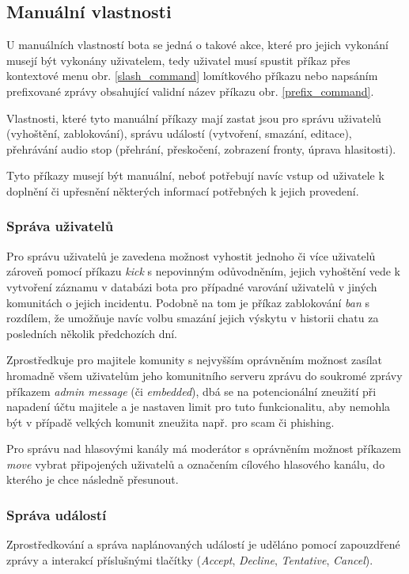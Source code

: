 \documentclass[
  program=inf,
biblatex=false,
sourcecodes=true,
joinlists=true,
  figures=true,
  tables=true,
  glossaries=true,
  index=false
]{kidiplom}
\begin{document}
\subsection{Manuální vlastnosti}
U manuálních vlastností bota se jedná o takové akce, které pro jejich vykonání musejí být vykonány uživatelem,
tedy uživatel musí spustit příkaz přes kontextové menu obr. \ref{slash_command} lomítkového příkazu nebo 
napsáním prefixované zprávy obsahující validní název příkazu obr. \ref{prefix_command}.

Vlastnosti, které
tyto manuální příkazy mají zastat jsou pro správu uživatelů (vyhoštění, zablokování), správu událostí (vytvoření, smazání, editace),
přehrávání audio stop (přehrání, přeskočení, zobrazení fronty, úprava hlasitosti).

Tyto příkazy musejí být manuální, neboť potřebují navíc vstup od uživatele k doplnění či upřesnění
některých informací potřebných k jejich provedení.

\subsubsection{Správa uživatelů}
Pro správu uživatelů je zavedena možnost vyhostit jednoho 
či více uživatelů zároveň pomocí příkazu
{\it kick} s nepovinným odůvodněním, jejich vyhoštění vede k vytvoření záznamu v
databázi bota pro případné varování uživatelů v jiných komunitách o jejich incidentu.
Podobně na tom je příkaz zablokování {\it ban} s rozdílem, že umožňuje navíc volbu
smazání jejich výskytu v historii chatu za posledních několik předchozích dní.

Zprostředkuje
pro majitele komunity s nejvyšším oprávněním možnost zasílat hromadně všem
uživatelům jeho komunitního serveru zprávu do soukromé zprávy příkazem {\it admin
message} (či {\it embedded}), dbá se na potencionální zneužití při napadení účtu
majitele a je nastaven limit pro tuto funkcionalitu, aby nemohla být v
případě velkých komunit zneužita např. pro scam či phishing. 

Pro správu nad
hlasovými kanály má moderátor s oprávněním možnost příkazem {\it move} vybrat
 připojených uživatelů a označením cílového hlasového kanálu, do
kterého je chce následně přesunout. 

\subsubsection{Správa událostí}
Zprostředkování a správa naplánovaných událostí je uděláno pomocí zapouzdřené zprávy a
interakcí příslušnými tlačítky ({\it Accept}, {\it Decline}, {\it Tentative}, {\it Cancel}).
\end{document}
